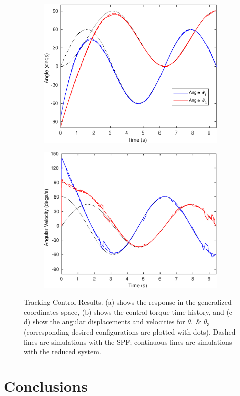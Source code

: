 \documentclass[10pt,final,journal,letterpaper,oneside,twocolumn]{IEEEtran}
\newcounter{mytempcntr}
\begin{document}
\begin{figure}[!h]
  \begin{subfigure}[!t]{0.5\linewidth}
    \centering
    \includegraphics[width=0.7\linewidth]{./FIGS/TRACK_1}
    \caption{}
    \label{fig:track1}
  \end{subfigure}%
  \begin{subfigure}[!t]{0.5\linewidth}
    \centering
    \includegraphics[width=0.7\linewidth]{./FIGS/TRACK_2}
    \caption{}
    \label{fig:track2}
  \end{subfigure}
  \caption{Tracking Control Results. (a) shows the response in the
    generalized coordinates-space, (b) shows the control torque time
    history, and (c-d) show the angular displacements and velocities
    for $\theta_1$ \& $\theta_3$ (corresponding desired configurations
    are plotted with dots). Dashed lines are simulations with the SPF;
    continuous lines are simulations with the reduced system.}
  \label{fig:tracking}
\end{figure}

\section{Conclusions}
\label{sec:conclusions}
\end{document}
